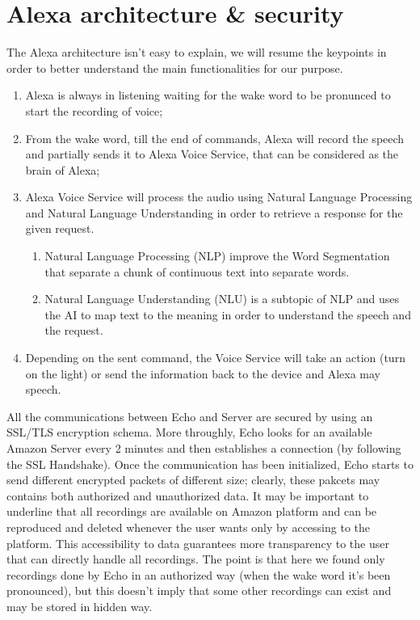 \documentclass[sigconf]{acmart}
\begin{document}
    \section{Alexa architecture \& security}
    The Alexa architecture isn't easy to explain, we will resume the keypoints in order to better understand the main functionalities for our purpose.
    \begin{enumerate}
        \item Alexa is always in listening waiting for the wake word to be pronunced to start the recording of voice;
        \item From the wake word, till the end of commands, Alexa will record the speech and partially sends it to Alexa Voice Service, that can be considered as the brain of Alexa;
        \item Alexa Voice Service will process the audio using Natural Language Processing and Natural Language Understanding in order to retrieve a response for the given request.
        \begin{enumerate}
            \item Natural Language Processing (NLP) improve the Word Segmentation that separate a chunk of continuous text into separate words.
            \item Natural Language Understanding (NLU) is a subtopic of NLP and uses the AI to map text to the meaning\cite{NLU} in order to understand the speech and the request.
        \end{enumerate}
        \item Depending on the sent command, the Voice Service will take an action (turn on the light) or send the information back to the device and Alexa may speech.
    \end{enumerate}
    All the communications between Echo and Server are secured by using an SSL/TLS encryption schema.
    More throughly, Echo looks for an available Amazon Server every 2 minutes and then establishes a connection (by following the SSL Handshake).
    Once the communication has been initialized, Echo starts to send different encrypted packets of different size; clearly, these pakcets may contains both authorized and unauthorized data.
    It may be important to underline that all recordings are available on Amazon platform and can be reproduced and deleted whenever the user wants only by accessing to the platform. This accessibility to data guarantees more transparency to the user that can directly handle all recordings.
    The point is that here we found only recordings done by Echo in an authorized way (when the wake word it's been pronounced), but this doesn't imply that some other recordings can exist and may be stored in hidden way.
\end{document}
